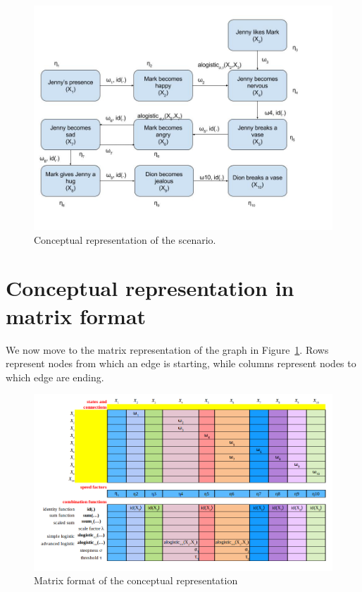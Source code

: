 \documentclass[a4paper]{article}
\begin{document}
\begin{figure}[!htbp]
\center
\includegraphics[width=\textwidth]{img/graphical_conceptual_representation}
\caption{Conceptual representation of the scenario.}
\label{fig:graphical_conceptual_representation}
\end{figure}

\section{Conceptual representation in matrix format}

We now move to the matrix representation of the graph in Figure~\ref{fig:graphical_conceptual_representation}. Rows represent nodes from which an edge is starting, while columns represent nodes to which edge are ending.

\begin{figure}[!htbp]
\centering
\includegraphics[width=\textwidth]{img/matrix_conceptual_representation}
\caption{Matrix format of the conceptual representation}
\label{fig:matrix_conceptual_representation}
\end{figure}
\end{document}
